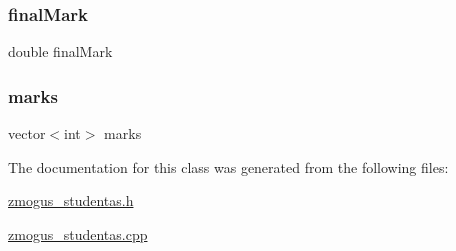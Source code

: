 \subsubsection{\texorpdfstring{final\+Mark}{finalMark}}
{\footnotesize\ttfamily double final\+Mark\hspace{0.3cm}{\ttfamily [protected]}}

\mbox{\label{classStudent_a460302cb4e9860802f65d94255a93811}} 
\subsubsection{\texorpdfstring{marks}{marks}}
{\footnotesize\ttfamily vector$<$int$>$ marks\hspace{0.3cm}{\ttfamily [protected]}}



The documentation for this class was generated from the following files\+:\begin{DoxyCompactItemize}
\item 
\mbox{\hyperlink{zmogus__studentas_8h}{zmogus\+\_\+studentas.\+h}}\item 
\mbox{\hyperlink{zmogus__studentas_8cpp}{zmogus\+\_\+studentas.\+cpp}}\end{DoxyCompactItemize}
